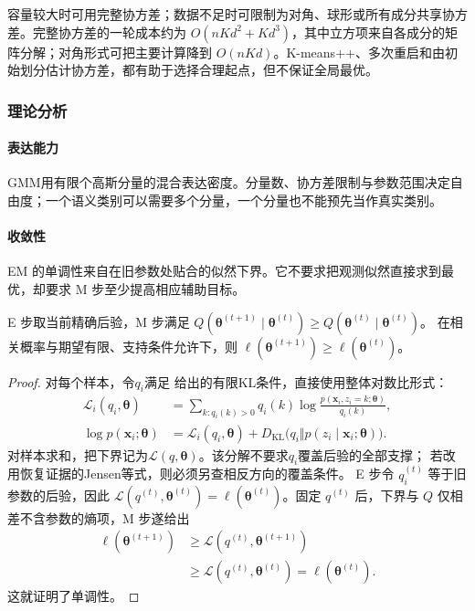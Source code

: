 容量较大时可用完整协方差；数据不足时可限制为对角、球形或所有成分共享协方差。完整协方差的一轮成本约为 $O(nKd^2+Kd^3)$，其中立方项来自各成分的矩阵分解；对角形式可把主要计算降到 $O(nKd)$。K-means++、多次重启和由初始划分估计协方差，都有助于选择合理起点，但不保证全局最优。

\subsubsection{理论分析}

\paragraph{表达能力}
GMM用有限个高斯分量的混合表达密度。分量数、协方差限制与参数范围决定自由度；一个语义类别可以需要多个分量，一个分量也不能预先当作真实类别。

\paragraph{收敛性}
EM 的单调性来自在旧参数处贴合的似然下界。它不要求把观测似然直接求到最优，却要求 M 步至少提高相应辅助目标。

\begin{theorem}[EM 的似然单调性]
 \label{thm:clustering-em}
 E 步取当前精确后验，M 步满足
 $Q(\bm{\theta}^{(t+1)}\mid\bm{\theta}^{(t)})
 \geq Q(\bm{\theta}^{(t)}\mid\bm{\theta}^{(t)})$。
 在相关概率与期望有限、支持条件允许下，则
 $\ell(\bm{\theta}^{(t+1)})\geq\ell(\bm{\theta}^{(t)})$。
\end{theorem}
\begin{proof}
对每个样本，令$q_i$满足
给出的有限KL条件，直接使用整体对数比形式：
\[
 \begin{aligned}
 \mathcal L_i(q_i,\bm\theta)
 &=\sum_{k:q_i(k)>0}q_i(k)
    \log\frac{p(\bm x_i,z_i=k;\bm\theta)}{q_i(k)},\\
 \log p(\bm x_i;\bm\theta)
 &=\mathcal L_i(q_i,\bm\theta)
   +D_{\mathrm{KL}}\bigl(q_i\Vert p(z_i\mid\bm x_i;\bm\theta)\bigr).
 \end{aligned}
\]
对样本求和，把下界记为$\mathcal L(q,\bm\theta)$。该分解不要求$q_i$覆盖后验的全部支撑；
若改用恢复证据的Jensen等式，则必须另查相反方向的覆盖条件。
E 步令 $q_i^{(t)}$ 等于旧参数的后验，因此 $\mathcal{L}(q^{(t)},\bm{\theta}^{(t)})=\ell(\bm{\theta}^{(t)})$。固定 $q^{(t)}$ 后，下界与 $Q$ 仅相差不含参数的熵项，M 步遂给出
\[
 \begin{aligned}
 \ell(\bm{\theta}^{(t+1)})
 &\geq\mathcal{L}(q^{(t)},\bm{\theta}^{(t+1)})\\
 &\geq\mathcal{L}(q^{(t)},\bm{\theta}^{(t)})
 =\ell(\bm{\theta}^{(t)}).
 \end{aligned}
\]
这就证明了单调性。
\end{proof}

